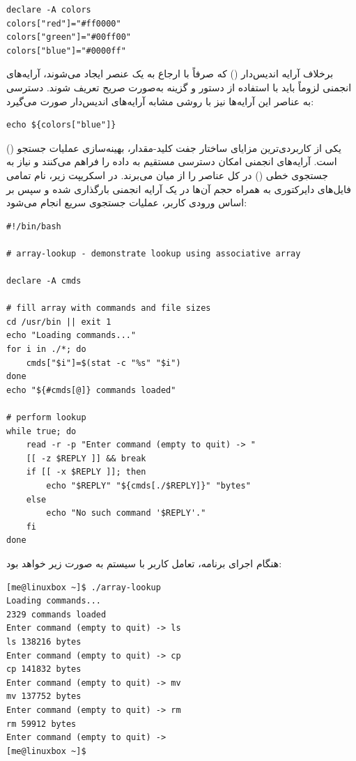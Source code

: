 \begin{latin}
\begin{lstlisting}
declare -A colors
colors["red"]="#ff0000"
colors["green"]="#00ff00"
colors["blue"]="#0000ff"
\end{lstlisting}
\end{latin}

برخلاف آرایه اندیس‌دار () که صرفاً با ارجاع به یک عنصر ایجاد می‌شوند، آرایه‌های انجمنی لزوماً باید با استفاده از دستور  و گزینه  به‌صورت صریح تعریف شوند. دسترسی به عناصر این آرایه‌ها نیز با روشی مشابه آرایه‌های اندیس‌دار صورت می‌گیرد:

\begin{latin}
\begin{lstlisting}
echo ${colors["blue"]}
\end{lstlisting}
\end{latin}

یکی از کاربردی‌ترین مزایای ساختار جفت کلید-مقدار، بهینه‌سازی عملیات جستجو () است. آرایه‌های انجمنی امکان دسترسی مستقیم به داده را فراهم می‌کنند و نیاز به جستجوی خطی () در کل عناصر را از میان می‌برند. در اسکریپت زیر، نام تمامی فایل‌های دایرکتوری  به همراه حجم آن‌ها در یک آرایه انجمنی بارگذاری شده و سپس بر اساس ورودی کاربر، عملیات جستجوی سریع انجام می‌شود:

\begin{latin}
\begin{lstlisting}
#!/bin/bash

# array-lookup - demonstrate lookup using associative array

declare -A cmds

# fill array with commands and file sizes
cd /usr/bin || exit 1
echo "Loading commands..."
for i in ./*; do
    cmds["$i"]=$(stat -c "%s" "$i")
done
echo "${#cmds[@]} commands loaded"

# perform lookup
while true; do
    read -r -p "Enter command (empty to quit) -> "
    [[ -z $REPLY ]] && break
    if [[ -x $REPLY ]]; then
        echo "$REPLY" "${cmds[./$REPLY]}" "bytes"
    else
        echo "No such command '$REPLY'."
    fi
done
\end{lstlisting}
\end{latin}

هنگام اجرای برنامه، تعامل کاربر با سیستم به صورت زیر خواهد بود:

\begin{latin}
\begin{lstlisting}
[me@linuxbox ~]$ ./array-lookup
Loading commands...
2329 commands loaded
Enter command (empty to quit) -> ls
ls 138216 bytes
Enter command (empty to quit) -> cp
cp 141832 bytes
Enter command (empty to quit) -> mv
mv 137752 bytes
Enter command (empty to quit) -> rm
rm 59912 bytes
Enter command (empty to quit) ->
[me@linuxbox ~]$
\end{lstlisting}
\end{latin}

